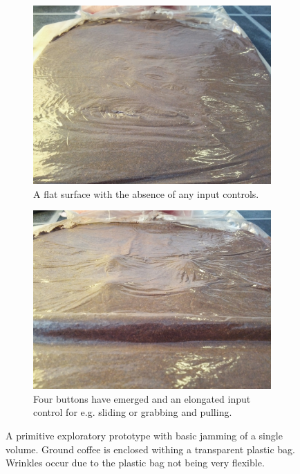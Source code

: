 \begin{figure}[h]
\centering
\begin{subfigure}[t]{.44\textwidth}
  \centering
  \includegraphics[width=\linewidth]{figures/jamming/concepts/inputs/jamming-inputs-flat}
    \caption{A flat surface with the absence of any input controls.}
\end{subfigure}%
\hspace{0.02\textwidth}
\begin{subfigure}[t]{.44\textwidth}
  \centering
  \includegraphics[width=\linewidth]{figures/jamming/concepts/inputs/jamming-inputs-buttons}
  \caption{Four buttons have emerged and an elongated input control for e.g. sliding or grabbing and pulling.}
\end{subfigure}
\caption{A primitive exploratory prototype with basic jamming of a single volume. Ground coffee is enclosed withing a transparent plastic bag. Wrinkles occur due to the plastic bag not being very flexible.}
\label{fig:ch:jamming:concepts:inputs-prototype}
\end{figure}

